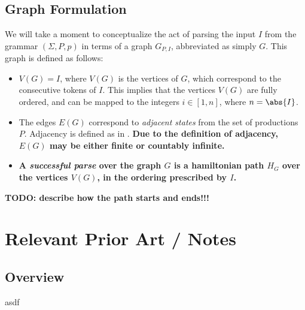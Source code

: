 \documentclass[10pt]{article}
\begin{document}
\subsection{Graph Formulation}
\label{sec:graph-formulation}

We will take a moment to conceptualize the act of parsing the input $I$ from the grammar $(\Sigma, P, p)$ in terms of a graph $G_{P,I}$, abbreviated as simply $G$. This graph is defined as follows:
\begin{itemize}
  \item $V(G) = I$, where $V(G)$ is the vertices of $G$, which correspond to the consecutive tokens of $I$. This implies that the vertices $V(G)$ are fully ordered, and can be mapped to the integers $i \in [1,n]$, where $n = \abs{I}$.
  \item The edges $E(G)$ correspond to \textit{adjacent states} from the set of productions $P$. Adjacency is defined as in . \textbf{Due to the definition of adjacency, $E(G)$ may be either finite or countably infinite.}
  \item \textbf{A \textit{successful parse} over the graph $G$ is a hamiltonian path $H_G$ over the vertices $V(G)$, in the ordering prescribed by $I$.}
\end{itemize}

\textbf{TODO: describe how the path starts and ends!!!}

\section{Relevant Prior Art / Notes}
\subsection{Overview}
\label{sec:overview}

asdf
\end{document}
